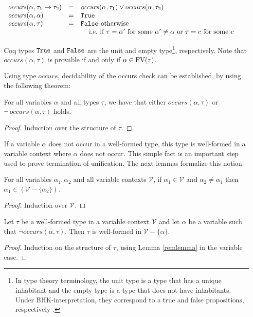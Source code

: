 \[ \begin{array}{llp{.7\textwidth}}
      \occurs (\alpha,\tau_1\to\tau_2) & = & $\occurs(\alpha,\tau_1) \lor occurs(\alpha,\tau_2)$ \\
      \occurs (\alpha,\alpha)         & = & $\True$ \\
      \occurs (\alpha, \tau)          & = & $\False$ otherwise\\
                                      &   & $\:\:\:\:$ i.e.~if $\tau = \alpha'$ for some $\alpha'\neq\alpha$ or $\tau = c$ for some $c$
  \end{array}
\]

Coq types $\text{\tt True}$ and $\text{\tt False}$ are the unit and empty type\footnote{In
  type theory terminology, the unit type is a type that has a unique
  inhabitant and the empty type is a type that does not have
  inhabitants. Under BHK-interpretation, they correspond to a true and
  false propositions, respectively \cite{CurryHoward06}.},
respectively. Note that $occurs(\alpha,\tau)$ is provable if and only if $\alpha \in \text{FV}(\tau)$.

Using type $occurs$, decidability of the occurs check can be
established, by using the following theorem:

\begin{Lemma}
   For all variables $\alpha$ and all types $\tau$, we have that
   either $occurs(\alpha,\tau)$ or $\neg\,occurs(\alpha,\tau)$ holds.
\end{Lemma}
\begin{proof}
    Induction over the structure of $\tau$.
\end{proof}

If a variable $\alpha$ does not occur in a well-formed type, this type
is well-formed in a variable context where $\alpha$ does not occur.
This simple fact is an important step used to prove termination of
unification. The next lemmas formalize this notion.

\begin{Lemma}\label{remlemma}
For all variables $\alpha_1,\alpha_2$ and all variable contexts $\mathcal{V}$,
if $\alpha_1\in\mathcal{V}$ and $\alpha_2 \neq \alpha_1$ then
$\alpha_1 \in (\mathcal{V} - \{\alpha_2\})$.
\end{Lemma}
\begin{proof}
Induction over $\mathcal{V}$.
\end{proof}

\begin{Lemma}
Let $\tau$ be a well-formed type in a variable context $\mathcal{V}$
and let $\alpha$ be a variable such that $\neg
occurs(\alpha,\tau)$. Then $\tau$ is well-formed in $\mathcal{V}-\{\alpha\}$.
\end{Lemma}
\begin{proof}
    Induction on the structure of $\tau$, using Lemma \ref{remlemma}
    in the variable case.
\end{proof}
